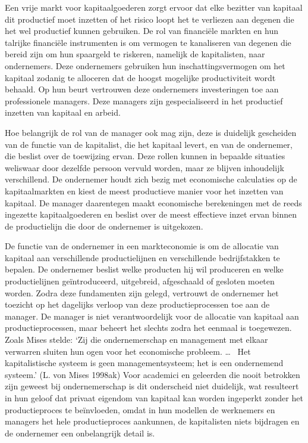 \documentclass[
  a5paper,
  smalldemyvopaper,11pt,twoside,onecolumn,openright,extrafontsizes,
hidelinks]{memoir}
\begin{document}
Een vrije markt voor kapitaalgoederen zorgt ervoor dat elke bezitter van
kapitaal dit productief moet inzetten of het risico loopt het te
verliezen aan degenen die het wel productief kunnen gebruiken. De rol
van financiële markten en hun talrijke financiële instrumenten is om
vermogen te kanaliseren van degenen die bereid zijn om hun spaargeld te
riskeren, namelijk de kapitalisten, naar ondernemers. Deze ondernemers
gebruiken hun inschattingsvermogen om het kapitaal zodanig te alloceren
dat de hoogst mogelijke productiviteit wordt behaald. Op hun beurt
vertrouwen deze ondernemers investeringen toe aan professionele
managers. Deze managers zijn gespecialiseerd in het productief inzetten
van kapitaal en arbeid.

Hoe belangrijk de rol van de manager ook mag zijn, deze is duidelijk
gescheiden van de functie van de kapitalist, die het kapitaal levert, en
van de ondernemer, die beslist over de toewijzing ervan. Deze rollen
kunnen in bepaalde situaties weliswaar door dezelfde persoon vervuld
worden, maar ze blijven inhoudelijk verschillend. De ondernemer houdt
zich bezig met economische calculaties op de kapitaalmarkten en kiest de
meest productieve manier voor het inzetten van kapitaal. De manager
daarentegen maakt economische berekeningen met de reeds ingezette
kapitaalgoederen en beslist over de meest effectieve inzet ervan binnen
de productielijn die door de ondernemer is uitgekozen.

De functie van de ondernemer in een markteconomie is om de allocatie van
kapitaal aan verschillende productielijnen en verschillende
bedrijfstakken te bepalen. De ondernemer beslist welke producten hij wil
produceren en welke productielijnen geïntroduceerd, uitgebreid,
afgeschaald of gesloten moeten worden. Zodra deze fundamenten zijn
gelegd, vertrouwt de ondernemer het toezicht op het dagelijks verloop
van deze productieprocessen toe aan de manager. De manager is niet
verantwoordelijk voor de allocatie van kapitaal aan productieprocessen,
maar beheert het slechts zodra het eenmaal is toegewezen. Zoals Mises
stelde: `Zij die ondernemerschap en management met elkaar verwarren
sluiten hun ogen voor het economische probleem. \ldots~ Het
kapitalistische systeem is geen managementsysteem; het is een
ondernemend systeem.' (L. von Mises 1998ak) Voor academici en geleerden
die nooit betrokken zijn geweest bij ondernemerschap is dit onderscheid
niet duidelijk, wat resulteert in hun geloof dat privaat eigendom van
kapitaal kan worden ingeperkt zonder het productieproces te beïnvloeden,
omdat in hun modellen de werknemers en managers het hele productieproces
aankunnen, de kapitalisten niets bijdragen en de ondernemer een
onbelangrijk detail is.
\end{document}
